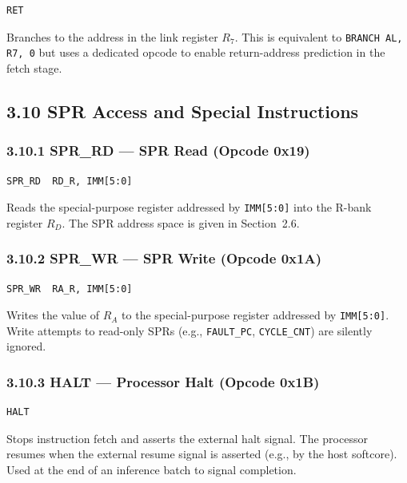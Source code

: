 \begin{verbatim}
RET
\end{verbatim}

Branches to the address in the link register \(R_7\). This is
equivalent to \texttt{BRANCH AL, R7, 0} but uses a dedicated
opcode to enable return-address prediction in the fetch stage.

\subsection{3.10 SPR Access and Special Instructions}\label{fa_71:spr-special}

\subsubsection{3.10.1 SPR\_RD --- SPR Read (Opcode 0x19)}

\begin{verbatim}
SPR_RD  RD_R, IMM[5:0]
\end{verbatim}

Reads the special-purpose register addressed by \texttt{IMM[5:0]}
into the R-bank register \(R_D\). The SPR address space is
given in Section~2.6.

\subsubsection{3.10.2 SPR\_WR --- SPR Write (Opcode 0x1A)}

\begin{verbatim}
SPR_WR  RA_R, IMM[5:0]
\end{verbatim}

Writes the value of \(R_A\) to the special-purpose register
addressed by \texttt{IMM[5:0]}. Write attempts to read-only
SPRs (e.g., \texttt{FAULT\_PC}, \texttt{CYCLE\_CNT}) are
silently ignored.

\subsubsection{3.10.3 HALT --- Processor Halt (Opcode 0x1B)}

\begin{verbatim}
HALT
\end{verbatim}

Stops instruction fetch and asserts the external halt signal.
The processor resumes when the external resume signal is
asserted (e.g., by the host softcore). Used at the end of an
inference batch to signal completion.

